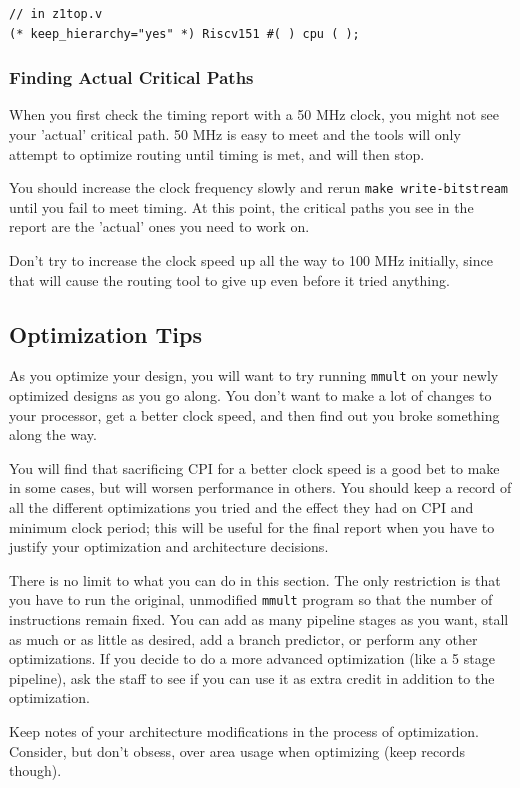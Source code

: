 \documentclass[11pt]{article}
\begin{document}
\begin{verbatim}
// in z1top.v
(* keep_hierarchy="yes" *) Riscv151 #( ) cpu ( );
\end{verbatim}

\subsubsection{Finding Actual Critical Paths}
When you first check the timing report with a 50 MHz clock, you might not see your 'actual' critical path.
50 MHz is easy to meet and the tools will only attempt to optimize routing until timing is met, and will then stop.

You should increase the clock frequency slowly and rerun \verb|make write-bitstream| until you fail to meet timing.
At this point, the critical paths you see in the report are the 'actual' ones you need to work on.

Don't try to increase the clock speed up all the way to 100 MHz initially, since that will cause the routing tool to give up even before it tried anything.

\subsection{Optimization Tips}
As you optimize your design, you will want to try running \verb|mmult| on your newly optimized designs as you go along. You don't want to make a lot of changes to your processor, get a better clock speed, and then find out you broke something along the way.

You will find that sacrificing CPI for a better clock speed is a good bet to make in some cases, but will worsen performance in others.
You should keep a record of all the different optimizations you tried and the effect they had on CPI and minimum clock period; this will be useful for the final report when you have to justify your optimization and architecture decisions.

There is no limit to what you can do in this section.
The only restriction is that you have to run the original, unmodified \verb|mmult| program so that the number of instructions remain fixed.
You can add as many pipeline stages as you want, stall as much or as little as desired, add a branch predictor, or perform any other optimizations.
If you decide to do a more advanced optimization (like a 5 stage pipeline), ask the staff to see if you can use it as extra credit in addition to the optimization.

Keep notes of your architecture modifications in the process of optimization.
Consider, but don't obsess, over area usage when optimizing (keep records though).
\end{document}
